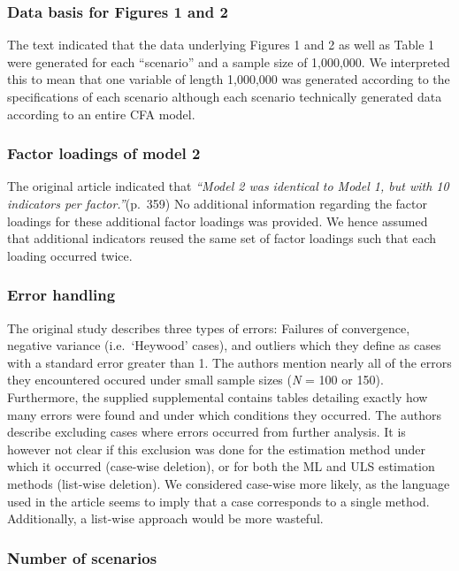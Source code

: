 \documentclass[10,a4paperpaper,]{article}
\begin{document}
\subsubsection{Data basis for Figures 1 and 2}

The text indicated that the data underlying Figures 1 and 2 as well as
Table 1 were generated for each ``scenario'' and a sample size of
1,000,000. We interpreted this to mean that one variable of length
1,000,000 was generated according to the specifications of each scenario
although each scenario technically generated data according to an entire
CFA model.

\subsubsection{Factor loadings of model 2}

The original article indicated that \emph{``Model 2 was identical to
Model 1, but with 10 indicators per factor.''}(p.~359) No additional
information regarding the factor loadings for these additional factor
loadings was provided. We hence assumed that additional indicators
reused the same set of factor loadings such that each loading occurred
twice.

\subsubsection{Error handling}

The original study describes three types of errors: Failures of
convergence, negative variance (i.e.~`Heywood' cases), and outliers
which they define as cases with a standard error greater than 1. The
authors mention nearly all of the errors they encountered occured under
small sample sizes (\emph{N} = 100 or 150). Furthermore, the supplied
supplemental contains tables detailing exactly how many errors were
found and under which conditions they occurred. The authors describe
excluding cases where errors occurred from further analysis. It is
however not clear if this exclusion was done for the estimation method
under which it occurred (case-wise deletion), or for both the ML and ULS
estimation methods (list-wise deletion). We considered case-wise more
likely, as the language used in the article seems to imply that a case
corresponds to a single method. Additionally, a list-wise approach would
be more wasteful.

\subsubsection{Number of scenarios}
\end{document}
